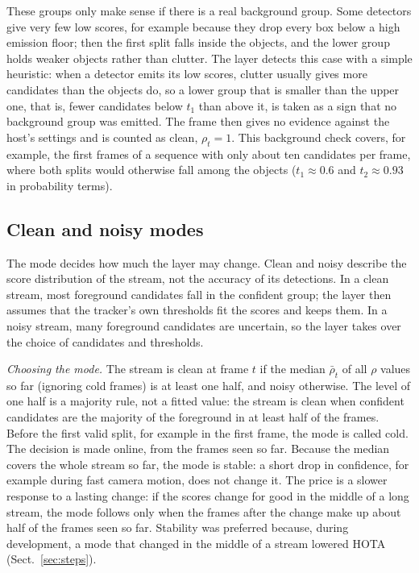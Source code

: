 \documentclass[pdflatex,sn-mathphys-num,iicol]{sn-jnl}
\begin{document}
These groups only make sense if there is a real background group. Some
detectors give very few low scores, for example because they drop every box
below a high emission floor; then the first split falls inside the objects,
and the lower group holds weaker objects rather than clutter. The layer
detects this case with a simple heuristic: when a detector emits its low
scores, clutter usually gives more candidates than the objects do, so a lower
group that is smaller than the upper one, that is, fewer candidates below
$t_1$ than above it, is taken as a sign that no background group was emitted.
The frame then gives no evidence against the host's settings and is counted
as clean, $\rho_t=1$. This background
check covers, for example, the first frames of a sequence with only about
ten candidates per frame, where both splits would otherwise fall among the
objects ($t_1\approx0.6$ and $t_2\approx0.93$ in probability terms).

\subsection{Clean and noisy modes}\label{sec:regimes}
The mode decides how much the layer may change. Clean and noisy describe the
score distribution of the stream, not the accuracy of its detections. In a
clean stream, most foreground candidates fall in the confident group; the
layer then assumes that the tracker's own thresholds fit the scores and keeps
them. In a noisy stream, many foreground candidates are uncertain, so the
layer takes over the choice of candidates and thresholds.

\emph{Choosing the mode.} The stream is clean at frame $t$ if the median
$\bar\rho_t$ of all $\rho$ values so far (ignoring cold frames) is at least
one half, and noisy otherwise. The level of one half is a majority rule, not
a fitted value: the stream is clean when confident candidates are the
majority of the foreground in at least half of the frames. Before the first valid split, for
example in the first frame, the mode is called cold. The decision is made
online, from the frames seen so far. Because the median covers the whole
stream so far, the mode is stable: a short drop in confidence, for example
during fast camera motion, does not change it. The price is a slower response
to a lasting change: if the scores change for good in the middle of a long
stream, the mode follows only when the frames after the change make up about
half of the frames seen so far. Stability was preferred because, during
development, a mode that changed in the middle of a stream lowered HOTA
(Sect.~\ref{sec:steps}).
\end{document}
